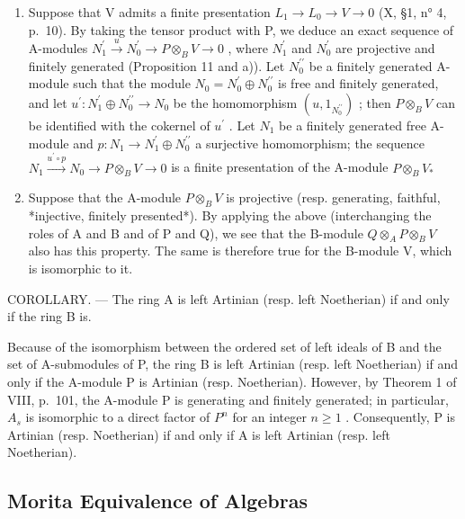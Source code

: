 \begin{enumerate}
\def\labelenumi{\alph{enumi})}
\setcounter{enumi}{4}
\item
  Suppose that V admits a finite presentation \(L_{1} \to L_{0} \to V \to 0\) (X, §1, n° 4, p.~10). By taking the tensor product with P, we deduce an exact sequence of A-modules \(N_{1}^{\prime} \xrightarrow{u} N_{0}^{\prime} \to P \otimes_{B} V \to 0\) , where \(N_{1}^{\prime}\) and \(N_{0}^{\prime}\) are projective and finitely generated (Proposition 11 and a)). Let \(N_{0}^{\prime\prime}\) be a finitely generated A-module such that the module \(N_{0} = N_{0}^{\prime} \oplus N_{0}^{\prime\prime}\) is free and finitely generated, and let \(u^{\prime}: N_{1}^{\prime} \oplus N_{0}^{\prime\prime} \to N_{0}\) be the homomorphism \((u, 1_{N_{0}^{\prime\prime}})\) ; then \(P \otimes_{B} V\) can be identified with the cokernel of \(u^{\prime}\) . Let \(N_{1}\) be a finitely generated free A-module and \(p: N_{1} \to N_{1}^{\prime} \oplus N_{0}^{\prime\prime}\) a surjective homomorphism; the sequence \(N_{1} \xrightarrow{u^{\prime} \circ p} N_{0} \to P \otimes_{B} V \to 0\) is a finite presentation of the A-module \(P \otimes_{B} V_*\)
\item
  Suppose that the A-module \(P \otimes_{B} V\) is projective (resp. generating, faithful, *injective, finitely presented*). By applying the above (interchanging the roles of A and B and of P and Q), we see that the B-module \(Q \otimes_{A} P \otimes_{B} V\) also has this property. The same is therefore true for the B-module V, which is isomorphic to it.
\end{enumerate}

COROLLARY. --- The ring A is left Artinian (resp. left Noetherian) if and only if the ring B is.

Because of the isomorphism between the ordered set of left ideals of B and the set of A-submodules of P, the ring B is left Artinian (resp. left Noetherian) if and only if the A-module P is Artinian (resp. Noetherian). However, by Theorem 1 of VIII, p.~101, the A-module P is generating and finitely generated; in particular, \(A_{s}\) is isomorphic to a direct factor of \(P^{n}\) for an integer \(n \geqslant 1\) . Consequently, P is Artinian (resp. Noetherian) if and only if A is left Artinian (resp. left Noetherian).

\subsection{Morita Equivalence of Algebras}

